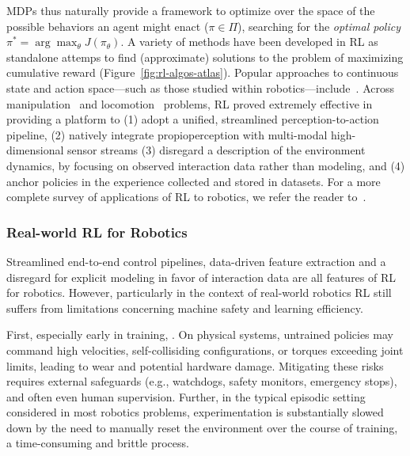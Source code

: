 MDPs thus naturally provide a framework to optimize over the space of the possible behaviors an agent might enact (\( \pi \in \Pi \)), searching for the \emph{optimal policy} \( \pi^* = \arg \max_{\theta} J(\pi_\theta) \).
A variety of methods have been developed in RL as standalone attemps to find (approximate) solutions to the problem of maximizing cumulative reward (Figure~\ref{fig:rl-algos-atlas}).
Popular approaches to continuous state and action space---such as those studied within robotics---include~\citet{schulmanTrustRegionPolicy2017, schulmanProximalPolicyOptimization2017, haarnojaSoftActorCriticOffPolicy2018}.
Across manipulation~\citep{openaiSolvingRubiksCube2019} and locomotion~\citep{leeLearningQuadrupedalLocomotion2020} problems, RL proved extremely effective in providing a platform to (1) adopt a unified, streamlined perception-to-action pipeline, (2) natively integrate propioperception with multi-modal high-dimensional sensor streams  (3) disregard a description of the environment dynamics, by focusing on observed interaction data rather than modeling, and (4) anchor policies in the experience collected and stored in datasets.
For a more complete survey of applications of RL to robotics, we refer the reader to~\citet{koberReinforcementLearningRobotics,tangDeepReinforcementLearning2025a}.

\subsubsection{Real-world RL for Robotics}
Streamlined end-to-end control pipelines, data-driven feature extraction and a disregard for explicit modeling in favor of interaction data are all features of RL for robotics.
However, particularly in the context of real-world robotics RL still suffers from limitations concerning machine safety and learning efficiency.

First, especially early in training, .
On physical systems, untrained policies may command high velocities, self-collisiding configurations, or torques exceeding joint limits, leading to wear and potential hardware damage.
Mitigating these risks requires external safeguards (e.g., watchdogs, safety monitors, emergency stops), and often even human supervision.
Further, in the typical episodic setting considered in most robotics problems, experimentation is substantially slowed down by the need to manually reset the environment over the course of training, a time-consuming and brittle process.

